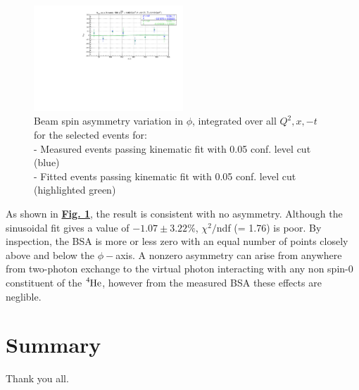 \documentclass[10pt,prd,aps,showpacs,twocolumn,unsortedaddress]{revtex4-1}
\newcommand\he{{\ce{^{4}He}}}
\renewcommand\b[1]{{\textbf{#1}}}
\renewcommand\u[1]{{\underline{#1}}}
\newcommand\Fig[1]{\b{{\u{{Fig. #1}}}}}
\begin{document}
  \begin{figure}[b!]
    \centering
    \captionsetup{width=\linewidth, format = hang}
        \centering
        \includegraphics[width = 0.5\textwidth]{figs/coh_pi0/raw_asym_Q2_bins}
    \caption{
      Beam spin asymmetry variation in $\phi$, integrated over all $Q^2, x, -t$ for the selected events for: \\
      \qquad - Measured events passing kinematic fit with 0.05 conf. level cut (blue)  \\
      \qquad - Fitted events   passing kinematic fit with 0.05 conf. level cut (highlighted green) 
    }
    \label{figs:kinfit:5C:raw_asym}
  \end{figure}

  As shown in \Fig{\ref{figs:kinfit:5C:raw_asym}}, the result is consistent with no asymmetry. Although the sinusoidal fit gives a value of $-1.07\pm3.22\%$, $\chi^2/$ndf (= 1.76) is poor. By inspection, the BSA is more or less zero with an equal number of points closely above and below the $\phi-$axis. A nonzero asymmetry can arise from anywhere from two-photon exchange to the virtual photon interacting with any non spin-0 constituent of the $\he$, however from the measured BSA these effects are neglible.
\section{Summary \label{summary}}


\begin{acknowledgments}
Thank you all. 
\end{acknowledgments}


\end{document}
